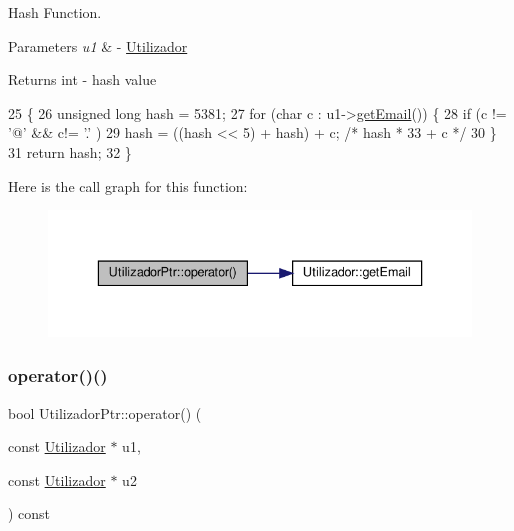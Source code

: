 Hash Function. 


\begin{DoxyParams}{Parameters}
{\em u1} & -\/ \hyperlink{classUtilizador}{Utilizador} \\
\hline
\end{DoxyParams}
\begin{DoxyReturn}{Returns}
int -\/ hash value 
\end{DoxyReturn}

\begin{DoxyCode}
25                                                 \{
26         \textcolor{keywordtype}{unsigned} \textcolor{keywordtype}{long} hash = 5381;
27         \textcolor{keywordflow}{for} (\textcolor{keywordtype}{char} c : u1->\hyperlink{classUtilizador_aea88bb297704762d0cccc909b8c2da54}{getEmail}()) \{
28             \textcolor{keywordflow}{if} (c != \textcolor{charliteral}{'@'} && c!= \textcolor{charliteral}{'.'} )
29                 hash = ((hash << 5) + hash) + c; \textcolor{comment}{/* hash * 33 + c */}
30         \}
31         \textcolor{keywordflow}{return} hash;
32     \}
\end{DoxyCode}
Here is the call graph for this function\+:
\nopagebreak
\begin{figure}[H]
\begin{center}
\leavevmode
\includegraphics[width=336pt]{structUtilizadorPtr_a51b14cea42ccf48388754bb5513f736f_cgraph}
\end{center}
\end{figure}
\mbox{\label{structUtilizadorPtr_afdc486a21619e0451d59dd4a9f244866}} 
\subsubsection{\texorpdfstring{operator()()}{operator()()}\hspace{0.1cm}{\footnotesize\ttfamily [2/2]}}
{\footnotesize\ttfamily bool Utilizador\+Ptr\+::operator() (\begin{DoxyParamCaption}\item[{const \hyperlink{classUtilizador}{Utilizador} $\ast$}]{u1,  }\item[{const \hyperlink{classUtilizador}{Utilizador} $\ast$}]{u2 }\end{DoxyParamCaption}) const\hspace{0.3cm}{\ttfamily [inline]}}



